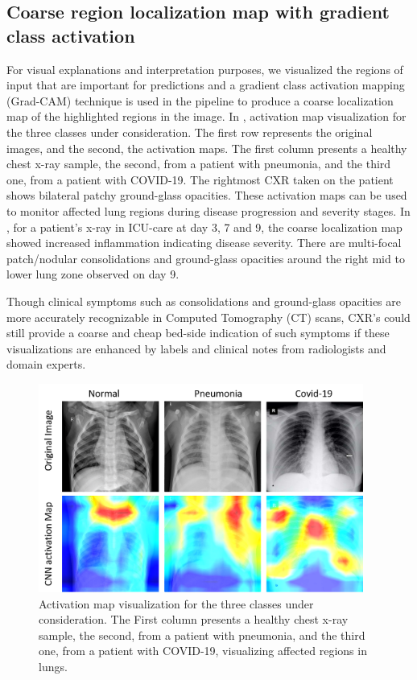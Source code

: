 \subsection{Coarse region localization map with gradient class activation}
 For visual explanations and interpretation purposes, we visualized the regions of input that are important for predictions and a gradient class activation mapping (Grad-CAM) technique \cite{selvaraju2017grad} is used in the pipeline to produce a coarse localization map of the highlighted regions in the image. In , activation map visualization for the three classes under consideration.  The first row represents the original images, and the second, the activation maps. The first column presents a healthy chest x-ray sample, the second, from a patient with pneumonia, and the third one, from a patient with COVID-19. The rightmost CXR taken on the patient shows bilateral patchy ground-glass opacities. These activation maps can be used to monitor affected lung regions during disease progression and severity stages.  In , for a patient's x-ray in ICU-care at day 3, 7 and 9, the coarse localization map showed increased inflammation indicating disease severity. There are multi-focal patch/nodular consolidations and ground-glass opacities around the right mid to lower lung zone observed on day 9.
 
 Though clinical symptoms such as consolidations and ground-glass opacities \cite{li2020ct} are more accurately recognizable in Computed Tomography (CT) scans, CXR's could still provide a coarse and cheap bed-side indication of such symptoms if these visualizations are enhanced by labels and clinical notes from radiologists and domain experts.

\begin{figure}
\centering
\includegraphics[width=0.95\textwidth]{images/Picture2_3 class.png}
   \caption{Activation map visualization for the three classes under consideration. The First column presents a healthy chest x-ray sample, the second, from a patient with
pneumonia, and the third one, from a patient with COVID-19, visualizing affected regions in lungs.}
\label{fig:activation_map_2}
\end{figure}

